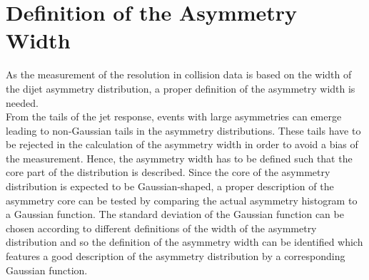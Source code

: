 \section{Definition of the Asymmetry Width}
\label{sec:jer_asymm_width_def}
As the measurement of the resolution in collision data is based on the width of the dijet asymmetry distribution, a proper definition of the asymmetry width is needed.\\
From the tails of the jet response, events with large asymmetries can emerge leading to non-Gaussian tails in the asymmetry distributions. These tails have to be rejected in the calculation of the asymmetry width in order to avoid a bias of the measurement. Hence, the asymmetry width has to be defined such that the core part of the distribution is described. Since the core of the asymmetry distribution is expected to be Gaussian-shaped, a proper description of the asymmetry core can be tested by comparing the actual asymmetry histogram to a Gaussian function. The standard deviation of the Gaussian function can be chosen according to different definitions of the width of the asymmetry distribution and so the definition of the asymmetry width can be identified which features a good description of the asymmetry distribution by a corresponding Gaussian function. \\
